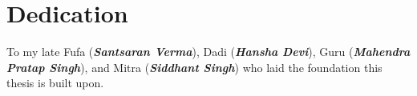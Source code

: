 \chapter{Dedication}
\begin{center}
    \vspace*{\fill}
				To my late Fufa (\textit{\textbf{Santsaran Verma}}), 
				Dadi (\textit{\textbf{Hansha Devi}}), 
				Guru (\textit{\textbf{Mahendra Pratap Singh}}), 
				and Mitra (\textit{\textbf{Siddhant Singh}}) who laid 
				the foundation this thesis is built upon.
    \vspace*{\fill}
\end{center}
